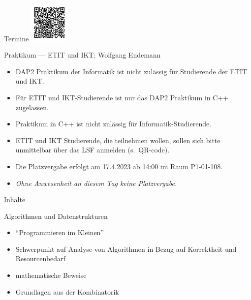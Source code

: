 \documentclass[aspectratio=1610, 11pt]{beamer}
\begin{document}
\begin{frame}{Termine}
		\hfill\includegraphics[height=20mm]{./images/DAP2_CPP_LSF.png}
	\begin{exampleblock}{Praktikum --- ETIT und IKT: Wolfgang Endemann}
		\begin{itemize}
			\item  DAP2 Praktikum der Informatik ist nicht zulässig für Studierende der ETIT und IKT.
			\item Für ETIT und IKT-Studierende ist nur das DAP2 Praktikum in C++ zugelassen.
			\item Praktikum in C++ ist nicht zulässig für Informatik-Studierende.
			\item ETIT und IKT Studierende, die teilnehmen wollen, sollen sich bitte unmittelbar über das LSF anmelden (s.\ QR-code). 
\item Die Platzvergabe erfolgt am 17.4.2023 ab 14:00 im Raum P1-01-108. \item  \emph{Ohne Anwesenheit an diesem Tag keine Platzvergabe.}
		\end{itemize}
	\end{exampleblock}
\end{frame}

\begin{frame}{Inhalte}
	\begin{exampleblock}{Algorithmen und Datenstrukturen}
		\begin{itemize}
			\item ``Programmieren im Kleinen''
			\item Schwerpunkt auf Analyse von Algorithmen in Bezug auf Korrektheit und Resourcenbedarf
			\item mathematische Beweise
			\item Grundlagen aus der Kombinatorik
		\end{itemize}
	\end{exampleblock}
\end{frame}
\end{document}
